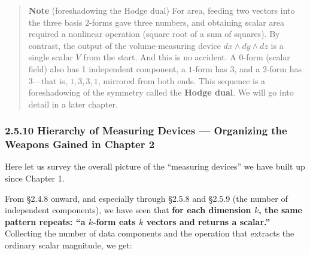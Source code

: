 \documentclass[a4paper,12pt,openany]{book}
\begin{document}
\begin{quote}
\textbf{Note} (foreshadowing the Hodge dual) For area, feeding two
vectors into the three basis \(2\)-forms gave three numbers, and
obtaining scalar area required a nonlinear operation (square root of a
sum of squares). By contrast, the output of the volume-measuring device
\(dx \wedge dy \wedge dz\) is a single scalar \(V\) from the start. And
this is no accident. A \(0\)-form (scalar field) also has 1 independent
component, a \(1\)-form has 3, and a \(2\)-form has 3—that is,
\(1, 3, 3, 1\), mirrored from both ends. This sequence is a
foreshadowing of the symmetry called the \textbf{Hodge dual}. We will go
into detail in a later chapter.
\end{quote}

\hypertarget{hierarchy-of-measuring-devices-organizing-the-weapons-gained-in-chapter-2}{%
\subsubsection{2.5.10 Hierarchy of Measuring Devices — Organizing the
Weapons Gained in Chapter
2}\label{hierarchy-of-measuring-devices-organizing-the-weapons-gained-in-chapter-2}}

Here let us survey the overall picture of the ``measuring devices'' we
have built up since Chapter 1.

From §2.4.8 onward, and especially through §2.5.8 and §2.5.9 (the number
of independent components), we have seen that
\textbf{for each dimension $k$, the same pattern repeats: “a $k$-form eats $k$ vectors and returns a scalar.”}
Collecting the number of data components and the operation that extracts
the ordinary scalar magnitude, we get:
\end{document}
